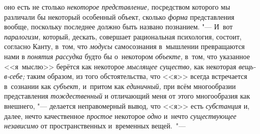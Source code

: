 оно есть не столько {\em некоторое
представление,} посредством которого мы различали бы
некоторый особенный объект, сколько {\em форма} представления
вообще, поскольку последнее должно быть названо познанием. "--- И~вот
{\em паралогизм,} который, дескать, совершает рациональная психология,
состоит, согласно Канту, в~том, что {\em модусы}
самосознания в~мышлении превращаются нами в {\em понятия рассудка}
будто бы о~некотором {\em объекте,} в~том, что
указанное <<я~мыслю>> берётся как некоторое {\em мыслящее существо,}
как некоторая {\em вещь-в-себе;} таким
образом, из того обстоятельства, что <<я>> всегда встречается в~сознании
как {\em субъект,} и~притом как {\em единичный,} при всём
многообразии представления {\em тождественный} и
отличающий меня от этого многообразия как внешнего, "---
делается неправомерный вывод, что <<я>> есть {\em субстанция} и,
далее, нечто качественное {\em простое} некоторое {\em одно}
и~нечто {\em существующее независимо} от пространственных и~временных
вещей.~"---

